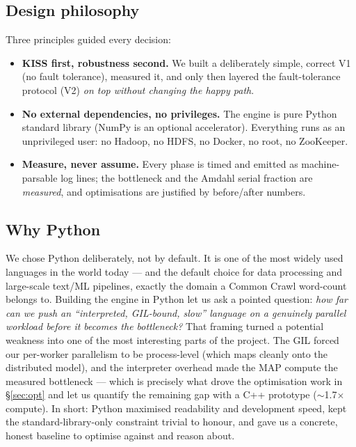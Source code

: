 \documentclass[11pt,a4paper]{article}
\begin{document}
\subsection{Design philosophy}

Three principles guided every decision:

\begin{itemize}
\item \textbf{KISS first, robustness second.} We built a deliberately simple,
correct V1 (no fault tolerance), measured it, and only then layered the
fault-tolerance protocol (V2) \emph{on top without changing the happy path}.
\item \textbf{No external dependencies, no privileges.} The engine is pure
Python standard library (NumPy is an optional accelerator). Everything runs as
an unprivileged user: no Hadoop, no HDFS, no Docker, no root, no ZooKeeper.
\item \textbf{Measure, never assume.} Every phase is timed and emitted as
machine-parsable log lines; the bottleneck and the Amdahl serial fraction are
\emph{measured}, and optimisations are justified by before/after numbers.
\end{itemize}

\subsection{Why Python}

We chose Python deliberately, not by default. It is one of the most widely used
languages in the world today --- and the default choice for data processing and
large-scale text/ML pipelines, exactly the domain a Common Crawl word-count
belongs to. Building the engine in Python let us ask a pointed
question: \emph{how far can we push an ``interpreted, GIL-bound, slow'' language
on a genuinely parallel workload before it becomes the bottleneck?} That framing
turned a potential weakness into one of the most interesting parts of the project. The
GIL forced our per-worker parallelism to be process-level (which maps cleanly
onto the distributed model), and the interpreter overhead made the MAP compute
the measured bottleneck --- which is precisely what drove the optimisation work
in \S\ref{sec:opt} and let us quantify the remaining gap with a C++ prototype
($\sim$1.7$\times$ compute). In short: Python maximised readability and
development speed, kept the standard-library-only constraint trivial to honour,
and gave us a concrete, honest baseline to optimise against and reason about.
\end{document}
